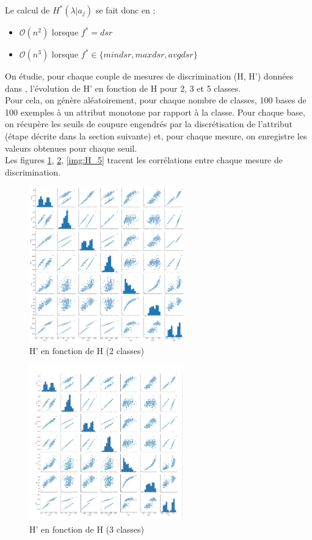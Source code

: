 \documentclass[a4paper]{article}
\begin{document}
Le calcul de $H^*(\lambda | a_j)$ se fait donc en :
\begin{itemize}
    \item $\mathcal{O}(n^2)$ lorsque $f^* = dsr$ 
    \item $\mathcal{O}(n^3)$ lorsque $f^* \in \{mindsr, maxdsr, avgdsr\}$  \\
\end{itemize} 

On étudie, pour chaque couple de mesures de discrimination (H, H') données dans
\cite{marsala-rank}, l'évolution de H' en fonction de H pour 2, 3 et 5 classes.
\\ Pour cela, on génère aléatoirement, pour chaque nombre de classes, 100 bases
de 100 exemples à un attribut monotone par rapport à la classe. Pour chaque
base, on récupère les seuils de coupure engendrés par la discrétisation de
l'attribut (étape décrite dans la section suivante) et, pour
chaque mesure, on enregistre les valeurs obtenues pour chaque seuil.\\ Les
figures \ref{img:H_2}, \ref{img:H_3}, \ref{img:H_5} tracent les corrélations
entre chaque mesure de discrimination. \\

\begin{figure}[H]
	\center 
	\includegraphics[width=0.6\textwidth]{images/H_2.png}
    \caption{H' en fonction de H (2 classes)}
    \label{img:H_2}
\end{figure}

\begin{figure}[H]

	\center 
	\includegraphics[width=0.6\textwidth]{images/H_3.png}
    \caption{H' en fonction de H (3 classes)}
    \label{img:H_3}
\end{figure}
\end{document}
